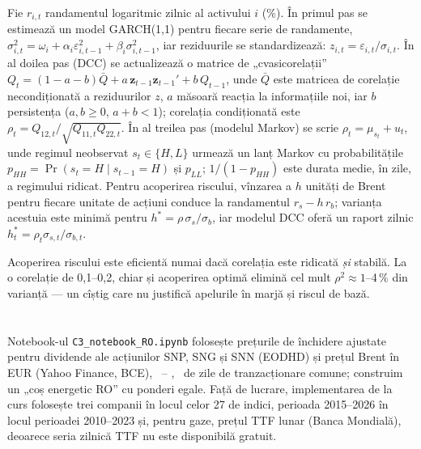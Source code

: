 {Fie $r_{i,t}$ randamentul logaritmic zilnic al activului $i$ (\%). În primul pas se estimează un model GARCH(1,1) pentru fiecare serie de randamente, $\sigma^2_{i,t}=\omega_i+\alpha_i\varepsilon^2_{i,t-1}+\beta_i\sigma^2_{i,t-1}$, iar reziduurile se standardizează: $z_{i,t}=\varepsilon_{i,t}/\sigma_{i,t}$.
În al doilea pas (DCC) se actualizează o matrice de „cvasicorelații” $Q_t=(1-a-b)\bar Q+a\,\mathbf z_{t-1}\mathbf z_{t-1}'+b\,Q_{t-1}$, unde $\bar Q$ este matricea de corelație necondiționată a reziduurilor $z$, $a$ măsoară reacția la informațiile noi, iar $b$ persistența ($a,b\ge0$, $a+b<1$);
corelația condiționată este $\rho_t=Q_{12,t}/\sqrt{Q_{11,t}Q_{22,t}}$.
În al treilea pas (modelul Markov) se scrie $\rho_t=\mu_{s_t}+u_t$, unde regimul neobservat $s_t\in\{H,L\}$ urmează un lanț Markov cu probabilitățile $p_{HH}=\Pr(s_t=H\mid s_{t-1}=H)$ și $p_{LL}$; $1/(1-p_{HH})$ este durata medie, în zile, a regimului ridicat.
Pentru acoperirea riscului, vînzarea a $h$ unități de Brent pentru fiecare unitate de acțiuni conduce la randamentul $r_s-h\,r_b$; varianța acestuia este minimă pentru $h^*=\rho\,\sigma_s/\sigma_b$, iar modelul DCC oferă un raport zilnic $h^*_t=\rho_t\sigma_{s,t}/\sigma_{b,t}$.}
\begin{decision}
%
{Acoperirea riscului este eficientă numai dacă corelația este ridicată \emph{și} stabilă. La o corelație de 0,1--0,2, chiar și acoperirea optimă elimină cel mult $\rho^2\approx1$--4\,\% din varianță --- un cîștig care nu justifică apelurile în marjă și riscul de bază.}
\end{decision}

\section{}
%
{Notebook-ul \texttt{C3\_notebook\_RO.ipynb} folosește prețurile de închidere ajustate pentru dividende ale acțiunilor SNP, SNG și SNN (EODHD) și prețul Brent în EUR (Yahoo Finance, BCE), \Nstart\ -- \Nend, \NnObs\ de zile de tranzacționare comune; construim un „coș energetic RO” cu ponderi egale.
Față de lucrare, implementarea de la curs folosește trei companii în locul celor 27 de indici, perioada 2015--2026 în locul perioadei 2010--2023 și, pentru gaze, prețul TTF lunar (Banca Mondială), deoarece seria zilnică TTF nu este disponibilă gratuit.}

